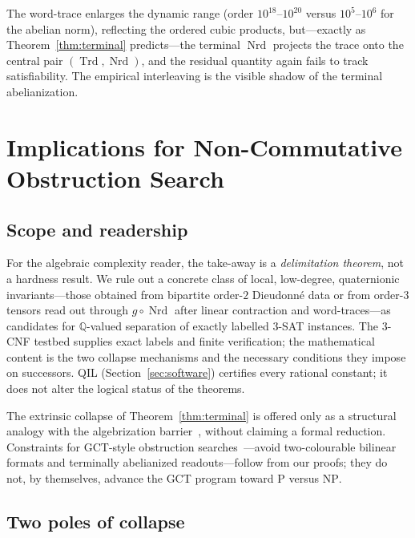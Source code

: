 \documentclass[pdflatex,sn-mathphys-num]{sn-jnl}
\theoremstyle{thmstyleone}%
\theoremstyle{thmstyletwo}%
\theoremstyle{thmstylethree}%
\newcommand{\QQ}{\mathbb{Q}}
\newcommand{\Nrd}{\operatorname{Nrd}}
\newcommand{\Trd}{\operatorname{Trd}}
\begin{document}
The word-trace enlarges the dynamic range (order $10^{18}$--$10^{20}$ versus
$10^5$--$10^6$ for the abelian norm), reflecting the ordered cubic products,
but---exactly as Theorem~\ref{thm:terminal} predicts---the terminal $\Nrd$
projects the trace onto the central pair $(\Trd,\Nrd)$, and the residual
quantity again fails to track satisfiability. The empirical interleaving is
the visible shadow of the terminal abelianization.

\section{Implications for Non-Commutative Obstruction Search}
\label{sec:discussion}

\subsection{Scope and readership}\label{sec:scope}

For the algebraic complexity reader, the take-away is a \emph{delimitation
theorem}, not a hardness result. We rule out a concrete class of local,
low-degree, quaternionic invariants---those obtained from bipartite
order-$2$ Dieudonn\'e data or from order-$3$ tensors read out through
$g\circ\Nrd$ after linear contraction and word-traces---as candidates for
$\QQ$-valued separation of exactly labelled $3$-SAT instances. The
$3$-CNF testbed supplies exact labels and finite verification; the
mathematical content is the two collapse mechanisms and the necessary
conditions they impose on successors. QIL (Section~\ref{sec:software})
certifies every rational constant; it does not alter the logical status of
the theorems.

The extrinsic collapse of Theorem~\ref{thm:terminal} is offered only as a
structural analogy with the algebrization barrier~\cite{AW}, without
claiming a formal reduction. Constraints for GCT-style obstruction
searches~\cite{GCT1,GCT2}---avoid two-colourable bilinear formats and
terminally abelianized readouts---follow from our proofs; they do not, by
themselves, advance the GCT program toward $\mathrm{P}$ versus $\mathrm{NP}$.

\subsection{Two poles of collapse}\label{sec:poles}
\end{document}
